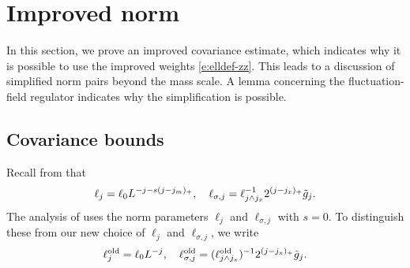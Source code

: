 \section{Improved norm}
\label{sec:Rpf1}

In this section, we prove an improved covariance estimate, which indicates why
it is possible to use the improved weights \eqref{e:elldef-zz}. This leads to a
discussion of simplified norm pairs beyond the mass scale. A lemma concerning the
fluctuation-field regulator indicates why the simplification is possible.


\subsection{Covariance bounds}
\label{sec:Cbds}

Recall from  that
\begin{equation}
\label{e:elldef}
\ell_j
	=
\ell_0 L^{-j - s (j - j_m)_+}, \quad
\ell_{\sigma,j}
	=
\ell_{j \wedge j_{x}}^{-1} 2^{(j - j_{x})_+} \tilde{g}_j.
\end{equation}
The analysis of \cite{BS-rg-IE,BS-rg-step} uses the norm parameters $\ell_j$ and $\ell_{\sigma,j}$ with $s = 0$.
To distinguish these from our
new choice  of $\ell_j$ and $\ell_{\sigma,j}$, we write
\begin{equation}
\label{e:ell-old}
    \ell_j^{\mathrm{old}} = \ell_0 L^{-j},
    \quad
    \ell_{\sigma,j}^{\mathrm{old}}  =
    (\ell_{j \wedge j_{x}}^{\rm old})^{-1}2^{(j - j_{x})_+}\tilde{g}_j.
\end{equation}

